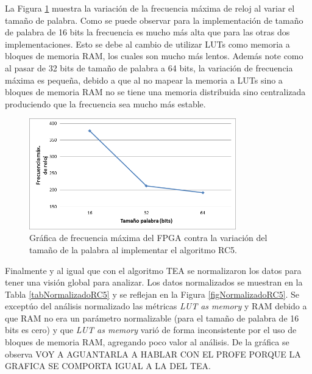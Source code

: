 La Figura \ref{figFrecuenciasRC5} muestra la variación de la frecuencia máxima de reloj al variar el tamaño de palabra. Como se puede observar para la implementación de tamaño de palabra de 16 bits la frecuencia es mucho más alta que para las otras dos implementaciones. Esto se debe al cambio de utilizar LUTs como memoria a bloques de memoria RAM, los cuales son mucho más lentos. Además note como al pasar de 32 bits de tamaño de palabra a 64 bits, la variación de frecuencia máxima es pequeña, debido a que al no mapear la memoria a LUTs sino a bloques de memoria RAM no se tiene una memoria distribuida sino centralizada produciendo que la frecuencia sea mucho más estable.
\begin{figure}[H]
	\centering
	\includegraphics[width=0.8\textwidth]{./images/figFrecuenciasRC5}
	\caption{Gráfica de frecuencia máxima del FPGA contra la variación del tamaño de la palabra al implementar el algoritmo RC5.}
	\label{figFrecuenciasRC5}
\end{figure}

Finalmente y al igual que con el algoritmo TEA se normalizaron los datos para tener una visión global para analizar. Los datos normalizados se muestran en la Tabla \ref{tabNormalizadoRC5} y se reflejan en la Figura \ref{figNormalizadoRC5}. Se exceptúo del análisis normalizado las métricas \textit{LUT as memory} y RAM debido a que RAM no era un parámetro normalizable (para el tamaño de palabra de 16 bits es cero) y que \textit{LUT as memory} varió de forma inconsistente por el uso de bloques de memoria RAM, agregando poco valor al análisis. De la gráfica se observa VOY A AGUANTARLA A HABLAR CON EL PROFE PORQUE LA GRAFICA SE COMPORTA IGUAL A LA DEL TEA.

